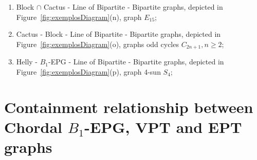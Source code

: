 \documentclass[9pt]{entcs}
\newtheorem{defi}{Definition}[section]
\begin{document}
\begin{enumerate}[label=(\arabic*)]
      \item Block $\cap$  Cactus -  Line of Bipartite - Bipartite graphs, depicted in Figure~\ref{fig:exemplosDiagram}(n), graph $E_{15}$;%
      \item Cactus - Block -  Line of Bipartite - Bipartite graphs, depicted in Figure~\ref{fig:exemplosDiagram}(o), graphs odd cycles $C_{2n+1},n\geq 2$;%
      \item Helly - $B_1$-EPG -  Line of Bipartite - Bipartite graphs, depicted in Figure~\ref{fig:exemplosDiagram}(p), graph 4-sun $S_4$;%
\end{enumerate}





    




\section{Containment relationship between Chordal $B_1$-EPG, VPT and EPT graphs }
\end{document}
